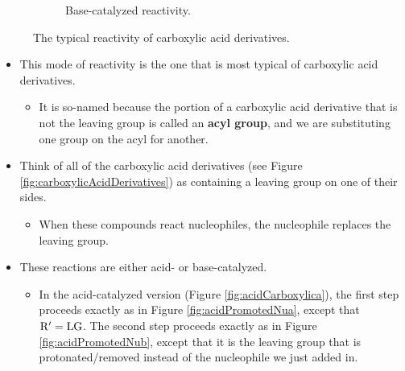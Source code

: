 \documentclass[../notes.tex]{subfiles}
\begin{document}
\begin{itemize}
\begin{figure}[h!]
\begin{subfigure}[b]{\linewidth}
                \arrow{->[][-\ce{B}]}
            \schemestop
            \caption{Base-catalyzed reactivity.}
            \label{fig:acidCarboxylicb}
        \end{subfigure}
        \caption{The typical reactivity of carboxylic acid derivatives.}
        \label{fig:acidCarboxylic}
    \end{figure}
    \begin{itemize}
        \item This mode of reactivity is the one that is most typical of carboxylic acid derivatives.
        \begin{itemize}
            \item It is so-named because the portion of a carboxylic acid derivative that is not the leaving group is called an \textbf{acyl group}, and we are substituting one group on the acyl for another.
        \end{itemize}
        \item Think of all of the carboxylic acid derivatives (see Figure \ref{fig:carboxylicAcidDerivatives}) as containing a leaving group on one of their sides.
        \begin{itemize}
            \item When these compounds react nucleophiles, the nucleophile replaces the leaving group.
        \end{itemize}
        \item These reactions are either acid- or base-catalyzed.
        \begin{itemize}
            \item In the acid-catalyzed version (Figure \ref{fig:acidCarboxylica}), the first step proceeds exactly as in Figure \ref{fig:acidPromotedNua}, except that $\ce{R$'$}=\ce{LG}$. The second step proceeds exactly as in Figure \ref{fig:acidPromotedNub}, except that it is the leaving group that is protonated/removed instead of the nucleophile we just added in.

\end{itemize}
\end{itemize}
\end{itemize}
\end{document}
